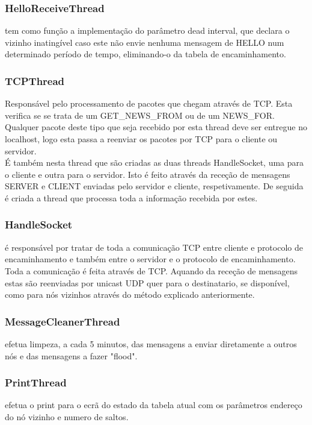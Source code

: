 \documentclass{llncs}
\begin{document}
\subsubsection{HelloReceiveThread} tem como função a implementação do parâmetro dead interval, que declara o vizinho inatingível caso este não envie nenhuma mensagem de HELLO num determinado período de tempo, eliminando-o da tabela de encaminhamento.

\subsubsection{TCPThread} Responsável pelo processamento de pacotes que chegam através de TCP. Esta verifica se se trata de um GET\_NEWS\_FROM ou de um NEWS\_FOR. Qualquer pacote deste tipo que seja recebido por esta thread deve ser entregue no localhost, logo esta passa a reenviar os pacotes por TCP para o cliente ou servidor.\\
É também nesta thread que são criadas as duas threads HandleSocket, uma para o cliente e outra para o servidor. Isto é feito através da receção de mensagens SERVER e CLIENT enviadas pelo servidor e cliente, respetivamente. De seguida é criada a thread que processa toda a informação recebida por estes.

\subsubsection{HandleSocket} é responsável por tratar de toda a comunicação TCP entre cliente e protocolo de encaminhamento e também entre o servidor e o protocolo de encaminhamento. Toda a comunicação é feita através de TCP. Aquando da receção de mensagens estas são reenviadas por unicast UDP quer para o destinatario, se disponível, como para nós vizinhos através do método explicado anteriormente.

\subsubsection{MessageCleanerThread} efetua limpeza, a cada 5 minutos, das mensagens a enviar diretamente a outros nós e das mensagens a fazer "flood".

\subsubsection{PrintThread} efetua o print para o ecrã do estado da tabela atual com os parâmetros endereço do nó vizinho e numero de saltos.
\end{document}
